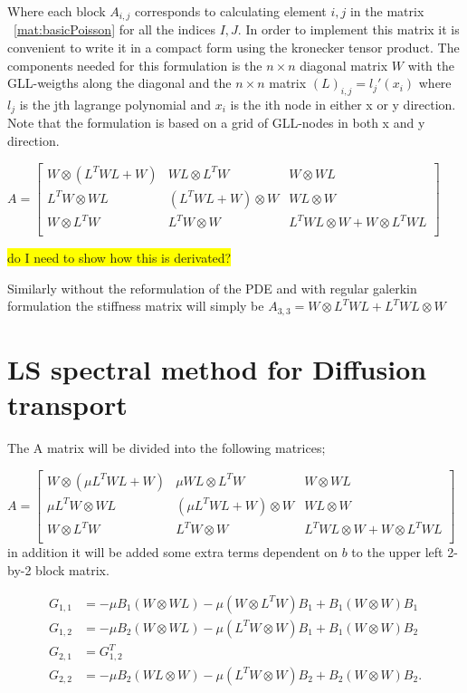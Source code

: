 Where each block $A_{i,j}$ corresponds to  calculating element $i,j$ in the matrix ~\ref{mat:basicPoisson} for all the indices $I,J$. In order to implement this matrix it is convenient to write it in a compact form using the kronecker tensor product. The components needed for this formulation is the $n \times n$ diagonal matrix $ W $ with the GLL-weigths along the diagonal and the $n \times n$ matrix $(L)_{i,j}= l_j'(x_i)$ where $l_j$ is the jth lagrange polynomial and $x_i$ is the ith node in either x or y direction. Note that the formulation is based on a grid of GLL-nodes in both x and y direction. 

$
A = 
\begin{bmatrix}
	W \otimes (L^TWL+W) & WL \otimes L^TW 		 &	W \otimes WL  \\ 	
	L^TW \otimes WL     & (L^TWL+W) \otimes W  &	WL \otimes W  \\ 	
	W \otimes L^TW		  & L^TW \otimes W       &  L^TWL \otimes W +	W\otimes L^TWL  \\ 	
\end{bmatrix}
$

\colorbox{yellow}{do I need to show how this is derivated?}

Similarly without the reformulation of the PDE and with regular galerkin formulation the stiffness matrix will simply be 
$A_{3,3} = W \otimes L^TWL+ L^TWL \otimes W$
\section{LS spectral method for Diffusion transport}
The A matrix will be divided into the following matrices;

$
A = 
\begin{bmatrix}
	W \otimes (\mu L^TWL+W) & \mu WL \otimes L^TW 		 &	W \otimes WL  \\ 	
	\mu L^TW \otimes WL     & (\mu L^TWL+W) \otimes W  &	WL \otimes W  \\ 	
	W \otimes L^TW		  & L^TW \otimes W       &  L^TWL \otimes W +	W\otimes L^TWL  \\ 	
\end{bmatrix}
$
in addition it will be added some extra terms dependent on $b$ to the upper left 2-by-2 block matrix. 

\begin{align}
	G_{1,1} &= -\mu B_1 (W \otimes WL) -\mu( W \otimes L^TW) B_1 + B_1( W\otimes W) B_1 \\ 	
	G_{1,2} &= -\mu B_2 (W \otimes WL) -\mu (L^TW \otimes W) B_1 + B_1 (W\otimes W) B_2 \\
	G_{2,1} &= G_{1,2}^T \\
	G_{2,2} &= -\mu B_2 (WL \otimes W) -\mu (L^TW \otimes W) B_2 + B_2 (W\otimes W) B_2. 
	\label{eq:additionalMatrixDiffTrans}
\end{align}
